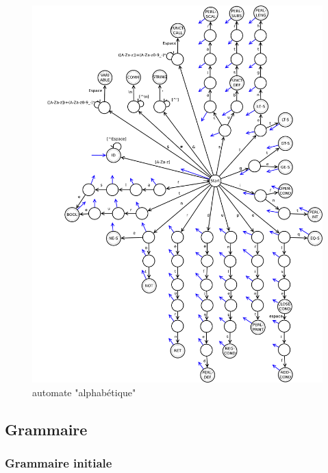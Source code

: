 \documentclass[a4paper,10pt]{article}
\begin{document}
  \begin{figure}[H] \hspace*{-2cm} 
    \centering
   	  \includegraphics[width=450pt]{automate2.pdf} 
			\caption{automate "alphabétique"}
			\label{automate2}
  \end{figure}	


\pagebreak
\subsection{Grammaire}

	\subsubsection{Grammaire initiale}
	
\end{document}
